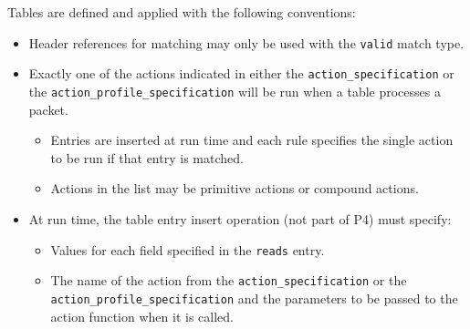 \documentclass[12pt]{article}
\begin{document}
Tables are defined and applied with the following conventions:

\begin{itemize}
\item
Header references for matching may only be used with the \texttt{valid} match type.
\item
Exactly one of the actions indicated in either the
\texttt{action_specification} or the \texttt{action_profile_specification}
will be run when a table processes a packet.

\begin{itemize}
\item
Entries are inserted at run time and each rule specifies the single action 
to be run if that entry is matched.
\item
Actions in the list may be primitive actions or compound actions.
\end{itemize}

\item
At run time, the table entry insert operation (not part of P4) must specify:

\begin{itemize}
\item
Values for each field specified in the \texttt{reads} entry.
\item
The name of the action from the \texttt{action_specification} or the
\texttt{action_profile_specification} and the parameters to be passed to the
action function when it is called.
\end{itemize}


\end{itemize}
\end{document}
